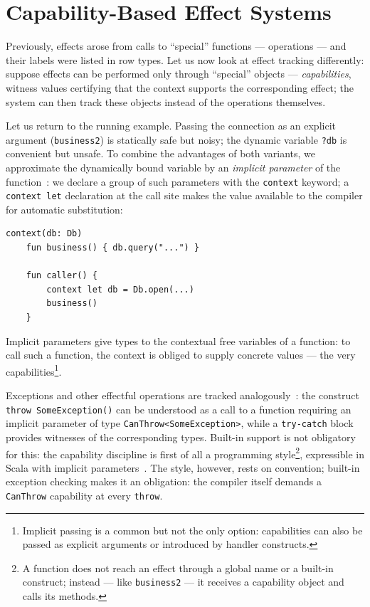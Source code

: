 \documentclass[11pt]{article}
\begin{document}
\section{Capability-Based Effect Systems}
\label{sec:capabilities}

Previously, effects arose from calls to ``special'' functions --- operations --- and
their labels were listed in row types. Let us now look at effect tracking differently:
suppose effects can be performed only through ``special'' objects ---
\emph{capabilities}, witness values certifying that the context supports the
corresponding effect; the system can then track these objects instead of the operations
themselves.

Let us return to the running example. Passing the connection as an explicit argument
(\lstinline|business2|) is statically safe but noisy; the dynamic variable
\lstinline|?db| is convenient but unsafe. To combine the advantages of both variants, we
approximate the dynamically bound variable by an \emph{implicit parameter} of the
function~\cite{lewis2000implicit}: we declare a group of such parameters with the
\lstinline|context| keyword; a \lstinline|context let| declaration at the call site
makes the value available to the compiler for automatic substitution:
\begin{lstlisting}[language=colang]
    context(db: Db)
    fun business() { db.query("...") }

    fun caller() {
        context let db = Db.open(...)
        business()
    }
\end{lstlisting}
Implicit parameters give types to the contextual free variables of a function: to call
such a function, the context is obliged to supply concrete values --- the very
capabilities\footnote{Implicit passing is a common but not the only option: capabilities
can also be passed as explicit arguments or introduced by handler constructs.}.

Exceptions and other effectful operations are tracked
analogously~\cite{odersky2021safer}: the construct \lstinline|throw SomeException()| can
be understood as a call to a function requiring an implicit parameter of type
\lstinline|CanThrow<SomeException>|, while a \lstinline|try-catch| block provides
witnesses of the corresponding types. Built-in support is not obligatory for this: the
capability discipline is first of all a programming style\footnote{A function does not
reach an effect through a global name or a built-in construct; instead --- like
\lstinline|business2| --- it receives a capability object and calls its methods.},
expressible in Scala with implicit parameters~\cite{odersky2004scala}. The style,
however, rests on convention; built-in exception checking makes it an obligation: the
compiler itself demands a \lstinline|CanThrow| capability at every \lstinline|throw|.
\end{document}
